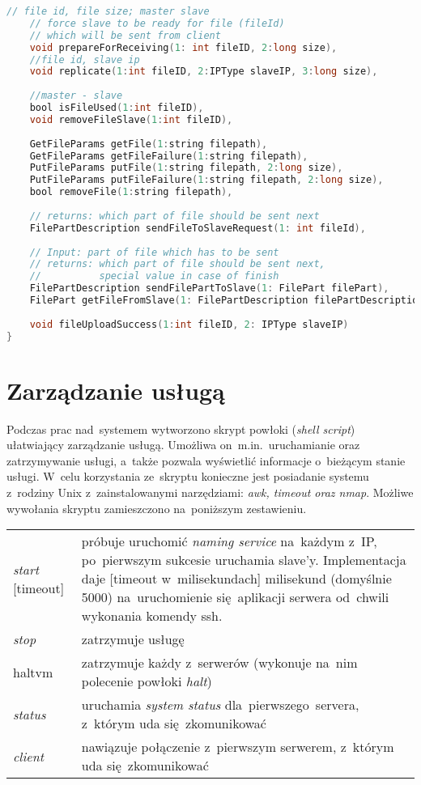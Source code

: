 \begin{lstlisting}[language=C,style=incode,
morekeywords={exception,typedef,i32,i64,namespace,enum,required,struct,bool}]
	// file id, file size; master slave
	// force slave to be ready for file (fileId)
	// which will be sent from client
	void prepareForReceiving(1: int fileID, 2:long size),
	//file id, slave ip
	void replicate(1:int fileID, 2:IPType slaveIP, 3:long size),
	
	//master - slave
	bool isFileUsed(1:int fileID),
	void removeFileSlave(1:int fileID),
	
	GetFileParams getFile(1:string filepath),
	GetFileParams getFileFailure(1:string filepath),
	PutFileParams putFile(1:string filepath, 2:long size),
	PutFileParams putFileFailure(1:string filepath, 2:long size),
	bool removeFile(1:string filepath),
	
	// returns: which part of file should be sent next
	FilePartDescription sendFileToSlaveRequest(1: int fileId),
	
	// Input: part of file which has to be sent
	// returns: which part of file should be sent next,
	//          special value in case of finish
	FilePartDescription sendFilePartToSlave(1: FilePart filePart),
	FilePart getFileFromSlave(1: FilePartDescription filePartDescription),
	
	void fileUploadSuccess(1:int fileID, 2: IPType slaveIP) 
}
\end{lstlisting}

\section[Zarządzanie usługą][Zarządzanie usługą]{Zarządzanie usługą}
Podczas prac nad~systemem wytworzono skrypt powłoki (\emph{shell script})
ułatwiający zarządzanie usługą. Umożliwa on~m.in.~uruchamianie oraz
zatrzymywanie usługi, a~także pozwala wyświetlić informacje o~bieżącym stanie
usługi. W~celu korzystania ze~skryptu konieczne jest posiadanie systemu
z~rodziny Unix z~zainstalowanymi narzędziami: \emph{awk, timeout oraz nmap}.
Możliwe wywołania skryptu zamieszczono na~poniższym zestawieniu.

\vspace{5mm}
\renewcommand{\arraystretch}{1.5}
\begin{tabular}[h]{p{3cm} p{11cm}}
\emph{start}	[timeout] & próbuje uruchomić \emph{naming service} na~każdym z~IP,
po~pierwszym sukcesie uruchamia slave'y. Implementacja daje [timeout
w~milisekundach] milisekund (domyślnie 5000) na~uruchomienie się~aplikacji serwera od~chwili wykonania komendy ssh. \\
\emph{stop} & zatrzymuje usługę \\
haltvm & zatrzymuje każdy z~serwerów (wykonuje na~nim polecenie powłoki
\emph{halt}) \\
\emph{status} & uruchamia \emph{system status} dla~pierwszego~servera, z~którym
uda się~zkomunikować \\
\emph{client} & nawiązuje połączenie z~pierwszym serwerem, z~którym uda
się~zkomunikować \\
\end{tabular}
